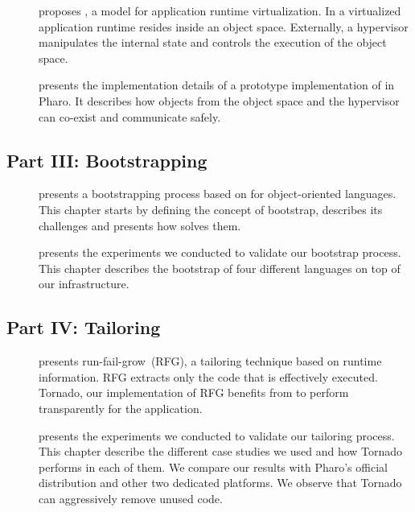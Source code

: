 \begin{description}

\item[] proposes \Vtt, a model for application runtime virtualization. In \Vtt a virtualized application runtime resides inside an object space. Externally, a hypervisor manipulates the internal state and controls the execution of the object space.

\item[] presents the implementation details of a prototype implementation of \Vtt in Pharo. It describes how objects from the object space and the hypervisor can co-exist and communicate safely.
\end{description}

\subsection{Part III: Bootstrapping}

\begin{description}

\item[] presents a bootstrapping process based on \Vtt for object-oriented languages. This chapter starts by defining the concept of bootstrap, describes its challenges and presents how \Vtt solves them.

\item[] presents the experiments we conducted to validate our bootstrap process. This chapter describes the bootstrap of four different languages on top of our infrastructure.

\end{description}

\subsection{Part IV: Tailoring}

\begin{description}

\item[] presents run-fail-grow~(RFG), a tailoring technique based on runtime information. RFG extracts only the code that is effectively executed. Tornado, our implementation of RFG benefits from \Vtt to perform transparently for the application.

\item[] presents the experiments we conducted to validate our tailoring process. This chapter describe the different case studies we used and how Tornado performs in each of them. We compare our results with Pharo's official distribution and other two dedicated platforms. We observe that Tornado can aggressively remove unused code.

\end{description}

